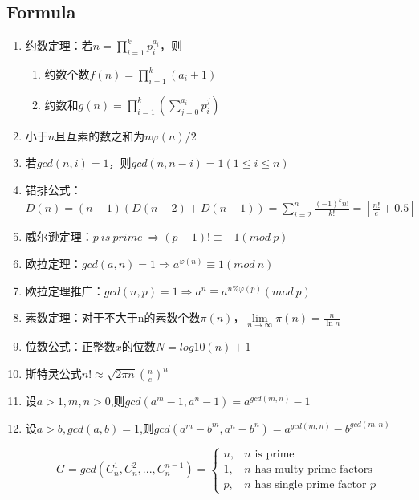 \documentclass[twoside]{article}
\begin{document}
\subsection{Formula}
\begin{enumerate}
\item 约数定理：若$n=\prod_{i=1}^kp_i^{a_i}$，则

\begin{enumerate}
\item 约数个数$f(n)=\prod_{i=1}^k(a_i+1)$
\item 约数和$g(n)=\prod_{i=1}^k(\sum_{j=0}^{a_i}p_i^j)$
\end{enumerate}

\item 小于$n$且互素的数之和为$n\varphi(n)/2$

\item 若$gcd(n,i)=1$，则$gcd(n,n-i)=1(1\leq i\leq n)$

\item 错排公式：$D(n)=(n-1)(D(n-2)+D(n-1))=\sum_{i=2}^n\frac{(-1)^kn!}{k!}=[\frac{n!}{e}+0.5]$

\item 威尔逊定理：$p\ is\ prime\ \Rightarrow (p-1)!\equiv-1(mod\ p)$

\item 欧拉定理：$gcd(a,n)=1\Rightarrow a^{\varphi(n)}\equiv1(mod\ n)$

\item 欧拉定理推广：$gcd(n,p)=1\Rightarrow a^n\equiv a^{n\%\varphi(p)}(mod\ p)$

\item 素数定理：对于不大于n的素数个数$\pi(n)$，$\lim\limits_{n\to\infty}\pi(n)=\frac{n}{\ln n}$

\item 位数公式：正整数$x$的位数$N=log10(n)+1$

\item 斯特灵公式$n!\approx\sqrt{2\pi n}(\frac{n}{e})^n$

\item 设$a>1,m,n>0$,则$gcd(a^m-1,a^n-1)=a^{gcd(m,n)}-1$

\item 设$a>b,gcd(a,b)=1$,则$gcd(a^m-b^m,a^n-b^n)=a^{gcd(m,n)}-b^{gcd(m,n)}$

$$
G=gcd(C_n^1,C_n^2,...,C_n^{n-1})=
\begin{cases}
	n, & \text{$n$ is prime} \\
	1, & \text{$n$ has multy prime factors} \\
	p, & \text{$n$ has single prime factor $p$}
\end{cases}
$$


\end{enumerate}
\end{document}
